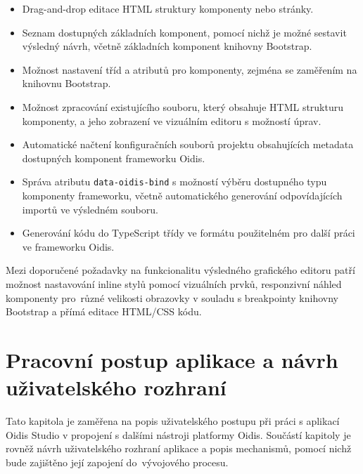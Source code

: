 \begin{itemize}
\item Drag-and-drop editace HTML struktury komponenty nebo stránky.
\item Seznam dostupných základních komponent, pomocí nichž je možné sestavit výsledný návrh, včetně základních komponent knihovny Bootstrap.
\item Možnost nastavení tříd a atributů pro komponenty, zejména se zaměřením na knihovnu Bootstrap.
\item Možnost zpracování existujícího souboru, který obsahuje HTML strukturu komponenty, a jeho zobrazení ve vizuálním editoru s možností úprav.
\item Automatické načtení konfiguračních souborů projektu obsahujících metadata dostupných komponent frameworku Oidis.
\item Správa atributu \texttt{data-oidis-bind} s možností výběru dostupného typu komponenty frameworku, včetně automatického generování odpovídajících importů ve výsledném souboru.
\item Generování kódu do TypeScript třídy ve formátu použitelném pro další práci ve frameworku Oidis.
\end{itemize}

Mezi doporučené požadavky na funkcionalitu výsledného grafického editoru patří možnost nastavování inline stylů pomocí vizuálních prvků, responzivní náhled komponenty pro~různé velikosti obrazovky v souladu s breakpointy knihovny Bootstrap a přímá editace HTML/CSS kódu.

\chapter{Pracovní postup aplikace a návrh uživatelského rozhraní}
\label{Navrh}

Tato kapitola je zaměřena na popis uživatelského postupu při práci s aplikací Oidis Studio v propojení s dalšími nástroji platformy Oidis. Součástí kapitoly je rovněž návrh uživatelského rozhraní aplikace a popis mechanismů, pomocí nichž bude zajištěno její zapojení do~vývojového procesu.

